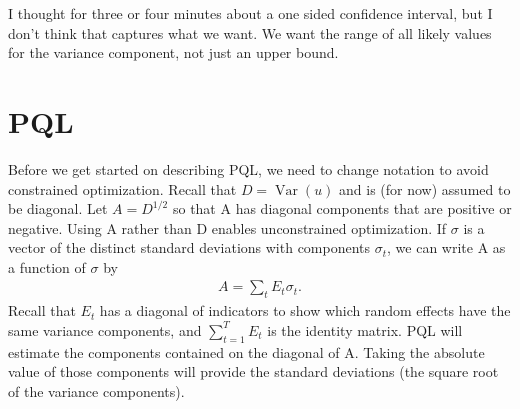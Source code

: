 \documentclass{article}
\DeclareMathOperator{\var}{Var}
\begin{document}
I thought for three or four minutes about a one sided confidence interval, but I don't think that captures what we want. We want the range of all likely values for the variance component, not just an upper bound.

%
%
%
%
%



\section{PQL}\label{sec:pql}
 Before we get started on describing PQL, we need to change notation to avoid constrained optimization.  Recall that $D=\var(u)$ and is (for now) assumed to be diagonal. Let $A=D^{1/2}$ so that A has diagonal components that are positive or negative. Using A rather than D enables unconstrained optimization.  If $\sigma$ is a vector of the distinct standard deviations with components $\sigma_t$, we can write A as a function of $\sigma$ by
\begin{align*}
A= \sum_t E_t \sigma_t.
\end{align*}
Recall that $E_t$ has a diagonal of indicators to show which random effects have the same variance components, and $\sum_{t=1}^T E_t$ is the identity matrix. PQL will estimate the components contained on the diagonal of A. Taking the absolute value of those components will provide the standard deviations (the square root of the variance components).
\end{document}
